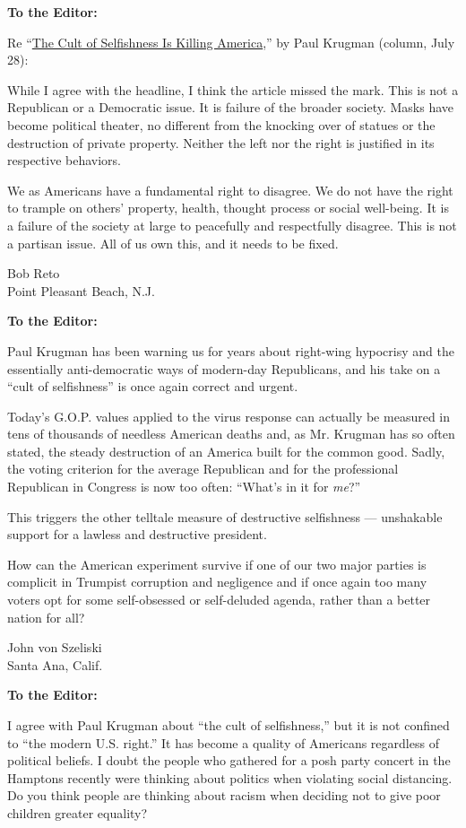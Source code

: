 \textbf{To the Editor:}

Re
``\href{https://www.nytimes3xbfgragh.onion/2020/07/27/opinion/us-republicans-coronavirus.html}{The
Cult of Selfishness Is Killing America},'' by Paul Krugman (column, July
28):

While I agree with the headline, I think the article missed the mark.
This is not a Republican or a Democratic issue. It is failure of the
broader society. Masks have become political theater, no different from
the knocking over of statues or the destruction of private property.
Neither the left nor the right is justified in its respective behaviors.

We as Americans have a fundamental right to disagree. We do not have the
right to trample on others' property, health, thought process or social
well-being. It is a failure of the society at large to peacefully and
respectfully disagree. This is not a partisan issue. All of us own this,
and it needs to be fixed.

Bob Reto\\
Point Pleasant Beach, N.J.

\textbf{To the Editor:}

Paul Krugman has been warning us for years about right-wing hypocrisy
and the essentially anti-democratic ways of modern-day Republicans, and
his take on a ``cult of selfishness'' is once again correct and urgent.

Today's G.O.P. values applied to the virus response can actually be
measured in tens of thousands of needless American deaths and, as Mr.
Krugman has so often stated, the steady destruction of an America built
for the common good. Sadly, the voting criterion for the average
Republican and for the professional Republican in Congress is now too
often: ``What's in it for \emph{me}?''

This triggers the other telltale measure of destructive selfishness ---
unshakable support for a lawless and destructive president.

How can the American experiment survive if one of our two major parties
is complicit in Trumpist corruption and negligence and if once again too
many voters opt for some self-obsessed or self-deluded agenda, rather
than a better nation for all?

John von Szeliski\\
Santa Ana, Calif.

\textbf{To the Editor:}

I agree with Paul Krugman about ``the cult of selfishness,'' but it is
not confined to ``the modern U.S. right.'' It has become a quality of
Americans regardless of political beliefs. I doubt the people who
gathered for a posh party concert in the Hamptons recently were thinking
about politics when violating social distancing. Do you think people are
thinking about racism when deciding not to give poor children greater
equality?

